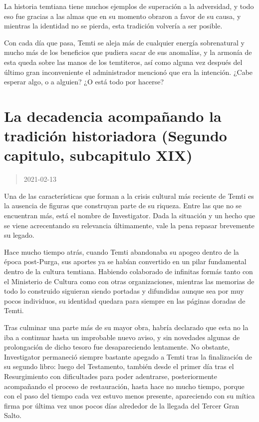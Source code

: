 \documentclass[
  spanish,
]{book}
\begin{document}
La historia temtiana tiene muchos ejemplos de superación a la adversidad, y todo eso fue gracias a las almas que en su momento obraron a favor de su causa, y mientras la identidad no se pierda, esta tradición volvería a ser posible.

Con cada día que pasa, Temti se aleja más de cualquier energía sobrenatural y mucho más de los beneficios que pudiera sacar de sus anomalías, y la armonía de esta queda sobre las manos de los temtiteros, así como alguna vez después del último gran inconveniente el administrador mencionó que era la intención. ¿Cabe esperar algo, o a alguien? ¿O está todo por hacerse?

\hypertarget{la-decadencia-acompauxf1ando-la-tradiciuxf3n-historiadora-segundo-capitulo-subcapitulo-xix}{%
\section{La decadencia acompañando la tradición historiadora (Segundo capitulo, subcapitulo XIX)}\label{la-decadencia-acompauxf1ando-la-tradiciuxf3n-historiadora-segundo-capitulo-subcapitulo-xix}}

\begin{quote}
2021-02-13
\end{quote}

Una de las características que forman a la crisis cultural más reciente de Temti es la ausencia de figuras que construyan parte de su riqueza. Entre las que no se encuentran más, está el nombre de Investigator. Dada la situación y un hecho que se viene acrecentando su relevancia últimamente, vale la pena repasar brevemente su legado.

Hace mucho tiempo atrás, cuando Temti abandonaba su apogeo dentro de la época post-Purga, sus aportes ya se habían convertido en un pilar fundamental dentro de la cultura temtiana. Habiendo colaborado de infinitas formás tanto con el Ministerio de Cultura como con otras organizaciones, mientras las memorias de todo lo construido siguieran siendo portadas y difundidas aunque sea por muy pocos individuos, su identidad quedara para siempre en las páginas doradas de Temti.

Tras culminar una parte más de su mayor obra, habría declarado que esta no la iba a continuar hasta un improbable nuevo aviso, y sin novedades algunas de prolongación de dicho tesoro fue desapareciendo lentamente. No obstante, Investigator permaneció siempre bastante apegado a Temti tras la finalización de su segundo libro: luego del Testamento, también desde el primer día tras el Resurgimiento con dificultades para poder adentrarse, posteriormente acompañando el proceso de restauración, hasta hace no mucho tiempo, porque con el paso del tiempo cada vez estuvo menos presente, apareciendo con su mítica firma por última vez unos pocos días alrededor de la llegada del Tercer Gran Salto.
\end{document}

